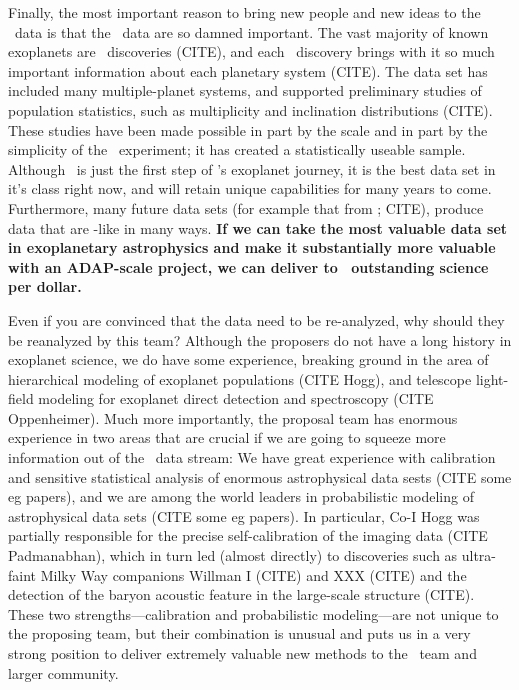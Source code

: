 \documentclass[letterpaper,12pt]{article}
\begin{document}
Finally, the most important reason to bring new people and new ideas
to the \Kepler\ data is that the \Kepler\ data are so damned
important.  The vast majority of known exoplanets are
\Kepler\ discoveries (CITE), and each \Kepler\ discovery brings with
it so much important information about each planetary system (CITE).
The data set has included many multiple-planet systems, and supported
preliminary studies of population statistics, such as multiplicity and
inclination distributions (CITE).  These studies have been made
possible in part by the scale and in part by the simplicity of the
\Kepler\ experiment; it has created a statistically useable sample.
Although \Kepler\ is just the first step of \NASA's exoplanet journey,
it is the best data set in it's class right now, and will retain
unique capabilities for many years to come.  Furthermore, many future
data sets (for example that from \TESS; CITE), produce data that are
\Kepler-like in many ways.  \textbf{If we can take the most valuable
  data set in exoplanetary astrophysics and make it substantially more
  valuable with an ADAP-scale project, we can deliver to
  \NASA\ outstanding science per dollar.}

Even if you are convinced that the data need to be re-analyzed, why
should they be reanalyzed by this team?  Although the proposers do not
have a long history in exoplanet science, we do have some experience,
breaking ground in the area of hierarchical modeling of exoplanet
populations (CITE Hogg), and telescope light-field modeling for
exoplanet direct detection and spectroscopy (CITE Oppenheimer).  Much
more importantly, the proposal team has enormous experience in two
areas that are crucial if we are going to squeeze more information out
of the \Kepler\ data stream: We have great experience with calibration
and sensitive statistical analysis of enormous astrophysical data
sests (CITE some eg papers), and we are among the world leaders in
probabilistic modeling of astrophysical data sets (CITE some eg
papers).  In particular, Co-I Hogg was partially responsible for the
precise self-calibration of the 
imaging data (CITE Padmanabhan), which in turn led (almost directly)
to discoveries such as ultra-faint Milky Way companions Willman I
(CITE) and XXX (CITE) and the detection of the baryon acoustic feature
in the large-scale structure (CITE).  These two
strengths---calibration and probabilistic modeling---are not unique to
the proposing team, but their combination is unusual and puts us in a
very strong position to deliver extremely valuable new methods to the
\Kepler\ team and larger community.
\end{document}
